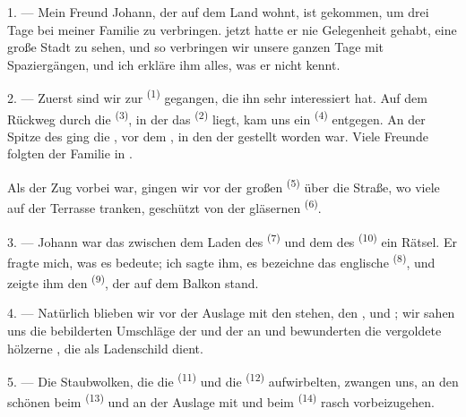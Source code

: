 \VUsaut{4.0mm}
\VUsaut{3.0mm}

\VUsaut{3.0mm}

1. --- Mein Freund Johann, der auf dem Land wohnt, ist gekommen, um drei Tage bei
meiner Familie zu verbringen.  jetzt hatte er nie Gelegenheit gehabt,
eine große Stadt zu sehen, und so verbringen wir unsere ganzen Tage mit Spaziergängen,
und ich erkläre ihm alles, was er nicht kennt.

2. --- Zuerst sind wir zur  \textsuperscript{(1)} gegangen, die ihn
sehr interessiert hat. Auf dem Rückweg durch die 
\textsuperscript{(3)}, in der das  \textsuperscript{(2)} liegt, kam
uns ein  \textsuperscript{(4)} entgegen. An der Spitze des
 ging die , vor dem ,
in den der  gestellt worden war. Viele Freunde folgten der Familie in
.

Als der Zug vorbei war, gingen wir vor der großen 
\textsuperscript{(5)} über die Straße, wo viele  auf der Terrasse
 tranken, geschützt von der gläsernen 
\textsuperscript{(6)}.

3. --- Johann war das  zwischen dem Laden des
 \textsuperscript{(7)} und dem des
 \textsuperscript{(10)} ein Rätsel. Er fragte mich, was
es bedeute; ich sagte ihm, es bezeichne das englische 
\textsuperscript{(8)}, und zeigte ihm den  \textsuperscript{(9)}, der
auf dem Balkon stand.

\VUsaut{3.0mm}

4. --- Natürlich blieben wir vor der Auslage mit den
 stehen, den ,  und
; wir sahen uns die bebilderten Umschläge der  und
der  an und bewunderten die vergoldete hölzerne ,
die als Ladenschild dient.

5. --- Die Staubwolken, die die  \textsuperscript{(11)} und die
 \textsuperscript{(12)} aufwirbelten, zwangen uns, an den schönen
 beim  \textsuperscript{(13)} und an
der Auslage mit  und  beim
 \textsuperscript{(14)} rasch vorbeizugehen.

